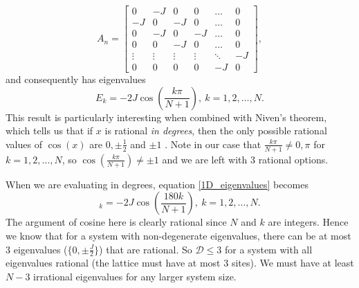 \documentclass[a4paper,10pt]{article}
\begin{document}
\begin{equation}
 A_n= \begin{bmatrix}
 0 & -J & 0 & 0&\dots & 0\\
 -J & 0 & -J & 0&\dots & 0\\
 0 & -J & 0 & -J& \dots & 0\\
 0 & 0 & -J & 0& \dots & 0\\
 \vdots & \vdots & \vdots&\vdots & \ddots & -J\\
 0 & 0 & 0 & 0 & -J & 0
 \end{bmatrix},
\end{equation}
and consequently has eigenvalues
\begin{equation}
\label{1D_eigenvalues}
 E_k=-2J\cos\left(\frac{k\pi}{N+1}\right), \ k=1,2,\dots,N.
\end{equation}
This result is particularly interesting when combined with Niven's theorem, which tells us that if $x$ is
rational \textit{in degrees}, then the only possible rational values of $\cos(x)$ are $0, \pm \frac{1}{2}$ and $\pm 1$ \cite{DoubleIvan}. Note in our case that $\frac{k\pi}{N+1}\neq 0, \pi$
for $k=1,2,\dots,N$, so $\cos(\frac{k\pi}{N+1})\neq\pm1$ and we are left with $3$ rational options.

When we are evaluating in degrees, equation \ref{1D_eigenvalues} becomes
\begin{equation}
 _k=-2J\cos\left(\frac{180k}{N+1}\right), \ k=1,2,\dots,N.
\end{equation}
The argument of cosine here is clearly rational since $N$ and $k$ are integers. Hence we know that for a system with non-degenerate eigenvalues, there can be at most $3$ eigenvalues ($\{0,\pm\frac{J}{2}\}$)
that are rational. So $\mathcal{D}\leq3$ for a system with all eigenvalues rational (the lattice must have at most $3$ sites). We must have at least $N-3$ irrational eigenvalues for any larger system size. 




\newpage






\end{document}
